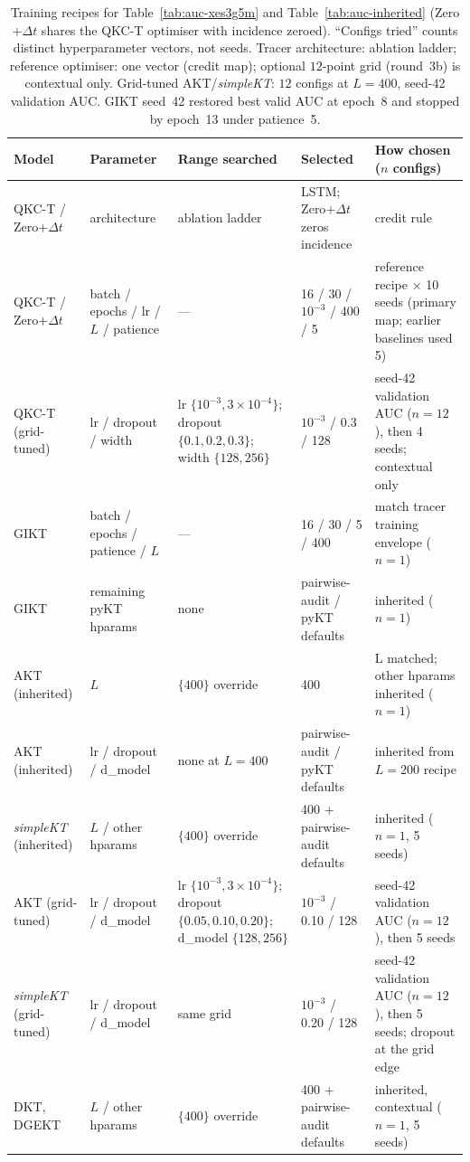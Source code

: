\begin{table}[p]
\caption{Training recipes for Table~\ref{tab:auc-xes3g5m} and
Table~\ref{tab:auc-inherited} (Zero$+\Delta t$ shares the QKC-T
optimiser with incidence zeroed). ``Configs tried'' counts distinct
hyperparameter vectors, not seeds. Tracer architecture: ablation ladder;
reference optimiser: one vector (credit map); optional $12$-point grid
(round~3b) is contextual only. Grid-tuned AKT/\textit{simpleKT}: $12$
configs at $L{=}400$, seed-42 validation AUC. GIKT seed~42 restored best
valid AUC at epoch~8 and stopped by epoch~13 under patience~5.}
\label{tab:hparams}
\centering
\tiny
\setlength{\tabcolsep}{2pt}
\renewcommand{\arraystretch}{0.85}
\begin{tabularx}{\textwidth}{@{}>{\raggedright\arraybackslash}p{2.5cm}XXXX@{}}
\toprule
Model & Parameter & Range searched & Selected & How chosen ($n$ configs) \\
\midrule
QKC-T / Zero$+\Delta t$ & architecture & ablation ladder & LSTM; Zero$+\Delta t$ zeros incidence & credit rule \\
QKC-T / Zero$+\Delta t$ & batch / epochs / lr / $L$ / patience & --- & 16 / 30 / $10^{-3}$ / 400 / 5 & reference recipe $\times$ 10 seeds (primary map; earlier baselines used 5) \\
QKC-T (grid-tuned) & lr / dropout / width & lr $\{10^{-3},3{\times}10^{-4}\}$; dropout $\{0.1,0.2,0.3\}$; width $\{128,256\}$ & $10^{-3}$ / 0.3 / 128 & seed-42 validation AUC ($n{=}12$), then 4 seeds; contextual only \\
GIKT & batch / epochs / patience / $L$ & --- & 16 / 30 / 5 / 400 & match tracer training envelope ($n{=}1$) \\
GIKT & remaining pyKT hparams & none & pairwise-audit / pyKT defaults & inherited ($n{=}1$) \\
AKT (inherited) & $L$ & $\{400\}$ override & 400 & L matched; other hparams inherited ($n{=}1$) \\
AKT (inherited) & lr / dropout / d\_model & none at $L{=}400$ & pairwise-audit / pyKT defaults & inherited from $L{=}200$ recipe \\
\textit{simpleKT} (inherited) & $L$ / other hparams & $\{400\}$ override & 400 + pairwise-audit defaults & inherited ($n{=}1$, 5 seeds) \\
AKT (grid-tuned) & lr / dropout / d\_model & lr $\{10^{-3}, 3{\times}10^{-4}\}$; dropout $\{0.05, 0.10, 0.20\}$; d\_model $\{128, 256\}$ & $10^{-3}$ / 0.10 / 128 & seed-42 validation AUC ($n{=}12$), then 5 seeds \\
\textit{simpleKT} (grid-tuned) & lr / dropout / d\_model & same grid & $10^{-3}$ / 0.20 / 128 & seed-42 validation AUC ($n{=}12$), then 5 seeds; dropout at the grid edge \\
DKT, DGEKT & $L$ / other hparams & $\{400\}$ override & 400 + pairwise-audit defaults & inherited, contextual ($n{=}1$, 5 seeds) \\
\bottomrule
\end{tabularx}
\end{table}
